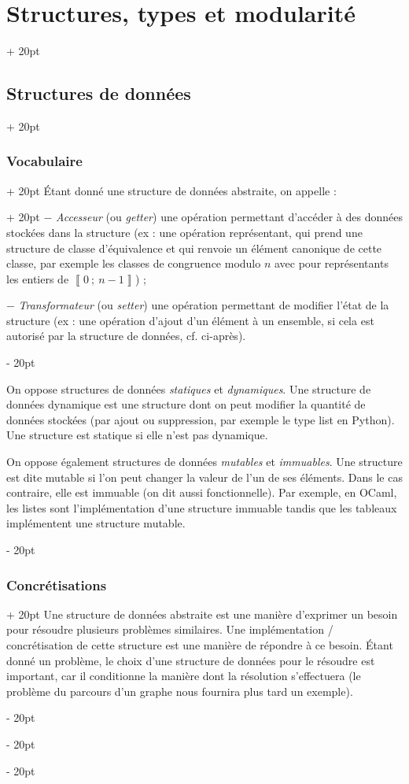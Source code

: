 \documentclass[a4paper, 12pt, twoside]{article}
\newcommand{\nset}[2]{\left\llbracket #1\ ;\ #2 \right\rrbracket}
\newcommand{\ind}[1][20pt]{\advance\leftskip + #1}
\newcommand{\deind}[1][20pt]{\advance\leftskip - #1}
\newenvironment{indt}[2][20pt]{#2 \par \ind[#1]}{\par \deind} %
\begin{document}
\begin{indt}{\section{Structures, types et modularité}}
\begin{indt}{\subsection{Structures de données}}
\begin{indt}{\subsubsection{Vocabulaire}}
\begin{indt}{Étant donné une structure de données abstraite, on appelle :}
                    $-$ \textit{Accesseur} (ou \textit{getter}) une opération permettant d’accéder à des données stockées dans la structure (ex : une opération représentant, qui prend une structure de classe d’équivalence et qui renvoie un élément canonique de cette classe, par exemple les classes de congruence modulo $n$ avec pour représentants les entiers de $\nset{0}{n - 1}$) ;
                    
                    $-$ \textit{Transformateur} (ou \textit{setter}) une opération permettant de modifier l’état de la structure (ex : une opération d’ajout d’un élément à un ensemble, si cela est autorisé par la structure de données, cf. ci-après).
                \end{indt}
                
                \vspace{6pt}
                
                On oppose structures de données \textit{statiques} et \textit{dynamiques}. Une structure de données dynamique est une structure dont on peut modifier la quantité de données stockées (par ajout ou suppression, par exemple le type list en Python). Une structure est statique si elle n’est pas dynamique.
                
                On oppose également structures de données \textit{mutables} et \textit{immuables}. Une structure est dite mutable si l’on peut changer la valeur de l’un de ses éléments. Dans le cas contraire, elle est immuable (on dit aussi fonctionnelle). Par exemple, en OCaml, les listes sont l’implémentation d’une structure immuable tandis que les tableaux implémentent une structure mutable.
            \end{indt}
            
            \begin{indt}{\subsubsection{Concrétisations}}
                Une structure de données abstraite est une manière d’exprimer un besoin pour résoudre plusieurs problèmes similaires. Une implémentation / concrétisation de cette structure est une manière de répondre à ce besoin. Étant donné un problème, le choix d’une structure de données pour le résoudre est important, car il conditionne la manière dont la résolution s’effectuera (le problème du parcours d’un graphe nous fournira plus tard un exemple).
                

\end{indt}
\end{indt}
\end{indt}
\end{document}
